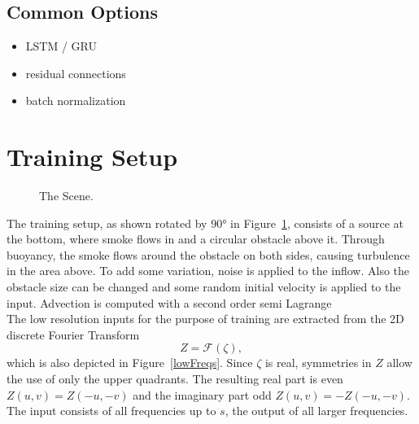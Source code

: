 \documentclass[sigconf]{acmart}
\begin{document}
\subsection{Common Options}
\begin{itemize}
	\item LSTM / GRU
	\item residual connections \cite{he2016deep}
	\item batch normalization
\end{itemize}
\section{Training Setup}
\begin{figure}
	\caption{The Scene.}
	\label{trainingScene}
\end{figure}
The training setup, as shown rotated by $\ang{90}$ in Figure~\ref{trainingScene}, consists of a source at the bottom, where smoke flows in and a circular obstacle above it. Through buoyancy, the smoke flows around the obstacle on both sides, causing turbulence in the area above. To add some variation, noise is applied to the inflow. Also the obstacle size can be changed and some random initial velocity is applied to the input.
Advection is computed with a second order semi Lagrange \\
The low resolution inputs for the purpose of training are extracted from the 2D discrete Fourier Transform 
\[
Z = \mathcal{F} (\zeta),
\]
which is also depicted in Figure~\ref{lowFreqs}.
Since $\zeta$ is real, symmetries in $Z$ allow the use of only the upper quadrants. The resulting real part is even $Z(u,v)=Z(-u,-v)$ and the imaginary part odd $Z(u,v)=-Z(-u,-v)$. The input consists of all frequencies up to $s$, the output of all larger frequencies.
\end{document}
